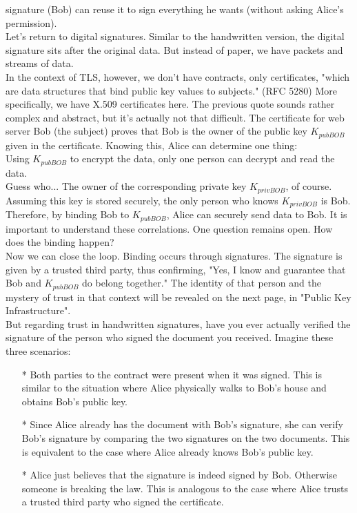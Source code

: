 signature (Bob) can reuse it to sign everything he wants (without asking Alice's permission).
\\
Let's return to digital signatures. Similar to the handwritten version, the digital 
signature sits after the original data. But instead of paper, we have packets and streams 
of data.
\\
In the context of TLS, however, we don't have contracts, only certificates, "which are 
data structures that bind public key values to subjects." (RFC 5280) More specifically, 
we have X.509 certificates here. The previous quote sounds rather complex and abstract, 
but it's actually not that difficult. The certificate for web server Bob (the subject) 
proves that Bob is the owner of the public key $K_{pubBOB}$ given in the certificate. 
Knowing this, Alice can determine one thing:
\\
Using $K_{pubBOB}$ to encrypt the data, only one person can decrypt and read the data.
\\
Guess who... The owner of the corresponding private key $K_{privBOB}$, of course. 
Assuming this key is stored securely, the only person who knows $K_{privBOB}$ is Bob. 
Therefore, by binding Bob to $K_{pubBOB}$, Alice can securely send data to Bob. It is 
important to understand these correlations. One question remains open. How does the binding happen?
\\
Now we can close the loop. 
Binding occurs through signatures. The signature is given by a trusted third party, 
thus confirming, "Yes, I know and guarantee that Bob and $K_{pubBOB}$ do belong together." 
The identity of that person and the mystery of trust in that context will be revealed 
on the next page, in "Public Key Infrastructure".
\\
But regarding trust in handwritten signatures, have you ever actually verified the 
signature of the person who signed the document you received. Imagine these three scenarios:
\begin{itemize}
    \item[*] Both parties to the contract were present when it was signed. This is similar to the situation where Alice physically walks to Bob's house and obtains Bob's public key.
    \item[*] Since Alice already has the document with Bob's signature, she can verify Bob's signature by comparing the two signatures on the two documents. This is equivalent to the case where Alice already knows Bob's public key.
    \item[*] Alice just believes that the signature is indeed signed by Bob. Otherwise someone is breaking the law. This is analogous to the case where Alice trusts a trusted third party who signed the certificate.
\end{itemize}

